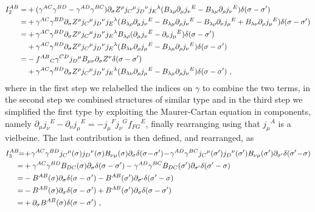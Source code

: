 \documentclass[12pt]{article}
\numberwithin{equation}{section}
\begin{document}
\begin{align}
I^{AB}_{2}=& +(\gamma^{AC}\gamma^{BD}-\gamma^{AD}\gamma^{BC})\partial_{\sigma}Z^{\rho}j_{C}{}^{\mu}j_{D}{}^{\nu}j_{E}{}^{\lambda}(B_{\lambda\rho}\partial_{\mu}j_{\nu}{}^{E}-B_{\lambda\mu}\partial_{\rho}j_{\nu}{}^{E})\delta(\sigma-\sigma')
\notag \\
=& +\gamma^{AC}\gamma^{BD}\partial_{\sigma}Z^{\rho}j_{C}{}^{\mu}j_{D}{}^{\nu}j_{E}{}^{\lambda}(B_{\lambda\rho}\partial_{\mu}j_{\nu}{}^{E}-B_{\lambda\mu}\partial_{\rho}j_{\nu}{}^{E}-B_{\lambda\rho}\partial_{\nu}j_{\mu}{}^{E}+B_{\lambda\nu}\partial_{\rho}j_{\mu}{}^{E})\delta(\sigma-\sigma')
\notag \\
=&+\gamma^{AC}\gamma^{BD}\partial_{\sigma}Z^{\rho}j_{C}{}^{\mu}j_{D}{}^{\nu}j_{E}{}^{\lambda}B_{\lambda\rho}(\partial_{\mu}j_{\nu}{}^{E}-\partial_{\nu}j_{\mu}{}^{E})\delta(\sigma-\sigma')
\notag \\
&+\gamma^{AC}\gamma^{BD}\partial_{\sigma}Z^{\rho}j_{C}{}^{\mu}j_{D}{}^{\nu}j_{E}{}^{\lambda}(B_{\lambda\nu}\partial_{\rho}j_{\mu}{}^{E}-B_{\lambda\mu}\partial_{\rho}j_{\nu}{}^{E})\delta(\sigma-\sigma')
\notag \\
=&-f^{AB}{}_{C}\gamma^{CD}j_{D}{}^{\mu}B_{\mu\nu}\partial_{\sigma}Z^{\nu}\delta(\sigma-\sigma')
\notag \\
&+\gamma^{AC}\gamma^{BD}\partial_{\sigma}Z^{\rho}j_{C}{}^{\mu}j_{D}{}^{\nu}j_{E}{}^{\lambda}(B_{\lambda\nu}\partial_{\rho}j_{\mu}{}^{E}-B_{\lambda\mu}\partial_{\rho}j_{\nu}{}^{E})\delta(\sigma-\sigma') \,\, ,
\end{align}
where in the first step we relabelled the indices on $\gamma$ to combine the two terms, in the second step we combined structures of similar type and in the third step we simplified the first type by exploiting the Maurer-Cartan equation in components, namely $\partial_{\mu}j_{\nu}{}^{E}-\partial_{\nu}j_{\mu}{}^{E}=-j_{\mu}{}^{F}j_{\nu}{}^{G}f_{FG}{}^{E}$, finally rearranging using that $j_{\mu}{}^{A}$ is a vielbeine. The last contribution is then defined, and rearranged, as
\begin{align}
I^{AB}_{3}\!\!=\!&+\!\gamma^{AC}\gamma^{BD}j_{C}{}^{\mu}(\sigma)j_{D}{}^{\nu}(\sigma)B_{\nu\mu}(\sigma)\partial_{\sigma}\delta(\sigma\!-\!\sigma')\!-\!\gamma^{AD}\gamma^{BC}j_{C}{}^{\mu}(\sigma')j_{D}{}^{\nu}(\sigma')B_{\nu\mu}(\sigma')\partial_{\sigma'}\delta(\sigma'\!-\!\sigma)
\notag \\
=&+\gamma^{AC}\gamma^{BD}B_{DC}(\sigma)\partial_{\sigma}\delta(\sigma-\sigma')-\gamma^{AD}\gamma^{BC}B_{DC}(\sigma')\partial_{\sigma'}\delta(\sigma'-\sigma)
\notag \\
=&-B^{AB}(\sigma)\partial_{\sigma}\delta(\sigma-\sigma')-B^{AB}(\sigma')\partial_{\sigma'}\delta(\sigma'-\sigma)
\notag \\
=&-B^{AB}(\sigma)\partial_{\sigma}\delta(\sigma-\sigma')+B^{AB}(\sigma')\partial_{\sigma}\delta(\sigma-\sigma')
\notag \\
=&+\partial_{\sigma}B^{AB}(\sigma)\delta(\sigma-\sigma') \,\, ,
\end{align}
\end{document}
